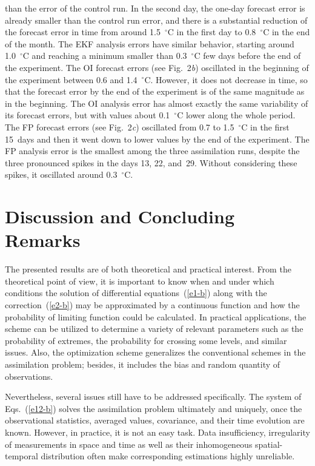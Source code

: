 \begin{multicols}{2}
\noindent
than the error of the control run. In the 
second day, the one-day forecast error is already smaller than the control run 
error, and there is a substantial reduction of the forecast error in time from around 
1.5~$^\circ$C in the first day to 0.8~$^\circ$C in the end of the month. The EKF 
analysis errors have similar behavior, starting around 1.0~$^\circ$C and reaching 
a minimum smaller than 0.3~$^\circ$C few days before the end of the experiment. The 
OI forecast errors (see Fig.~2\textit{b}) oscillated in the beginning of the experiment between 
0.6 and 1.4~$^\circ$C. However, it does not decrease in time, so that the forecast 
error by the end of the experiment is of the same magnitude as in the beginning. The OI 
analysis error has almost exactly the same variability of its forecast errors, but with 
values about 0.1~$^\circ$C lower along the whole period. The FP forecast errors (see Fig.~2\textit{c}) 
oscillated from 0.7 to 1.5~$^\circ$C in the first 15~days and then it 
went down to lower values by 
the end of the experiment. The FP analysis error is the smallest among the three assimilation 
runs, despite the three pronounced spikes in the days 13, 22, and~29. Without considering these 
spikes, it oscillated around 0.3~$^\circ$C.


\section{Discussion and Concluding Remarks}

\noindent
The presented results are of both theoretical and practical interest. 
From the theoretical point of view, it is important to know when and under 
which conditions the solution of differential equations~(\ref{e1-b}) along 
with the correction~(\ref{e2-b}) may be approximated by a continuous function 
and how the probability of limiting function could be calculated. In practical 
applications, the scheme can be utilized to determine a variety of relevant 
parameters such as the probability of extremes, the probability for crossing some 
levels, and similar issues. Also, the optimization scheme generalizes the conventional 
schemes in the assimilation problem; besides, it includes the bias and random quantity 
of observations.

Nevertheless, several issues still have to be addressed specifically. The system of 
Eqs.~(\ref{e12-b}) 
solves the assimilation problem ultimately and uniquely, once the observational statistics, 
averaged values, 
covariance, and their time evolution are known. However, in practice, it is not an easy task. 
Data insufficiency, irregularity of measurements in space and time as well as their 
inhomogeneous spatial-temporal distribution often make corresponding estimations 
highly unreliable.


\end{multicols}
